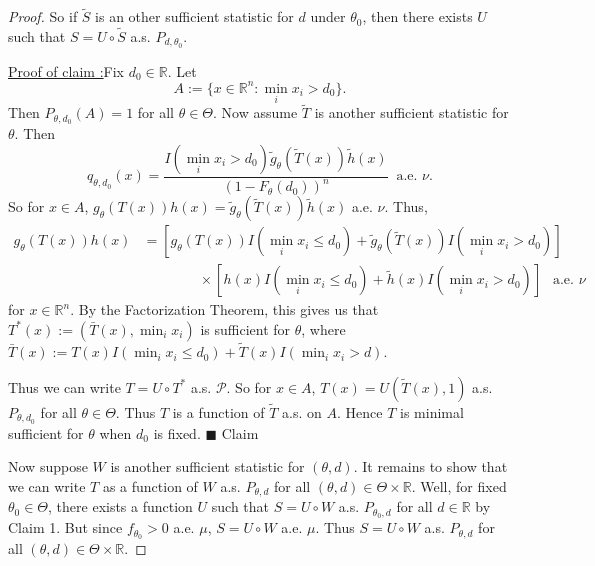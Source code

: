\documentclass[12pt]{article}
\newcounter{ProofCounter}
\newcounter{ClaimCounter}[ProofCounter]
\newenvironment{claim}[1]{\vspace{1mm}\stepcounter{ClaimCounter}\par\noindent\underline{\bf Claim \theClaimCounter:}\space#1}{}
\newenvironment{claimproof}[1]{\par\noindent\underline{Proof of claim \theClaimCounter:}\space#1}{\hfill $\blacksquare$ Claim \theClaimCounter}
\begin{document}
\begin{enumerate}[label=(\alph*)]
\begin{proof}
      \vspace{5mm}

      So if $\tilde{S}$ is an other sufficient statistic for $d$ under $\theta_0$, then there exists $U$ such that $S = U\circ \tilde{S}$ a.s. $P_{d,\theta_0}$.


      \begin{claimproof}
        Fix $d_0 \in \mathbb{R}$. Let 
        \[ 
          A := \{x \in \mathbb{R}^{n} : \min_{i} x_{i} > d_0\}.
        \]
        Then $P_{\theta, d_0}(A) = 1$ for all $\theta \in \Theta$. Now assume $\tilde{T}$ is another sufficient statistic for $\theta$.
        Then 
        \[ 
          q_{\theta, d_0}(x) = \frac{I(\min_i x_i > d_0)\tilde{g}_{\theta}(\tilde{T}(x)) \tilde{h}(x)}{(1 - F_{\theta}(d_0))^{n}}  \ \text{ a.e. }\nu. 
        \]
        So for $x \in A$, $g_{\theta}(T(x))h(x) = \tilde{g}_{\theta}(\tilde{T}(x))\tilde{h}(x)$ a.e. $\nu$. Thus,
        \begin{align*}
          g_{\theta}(T(x))h(x) & = [g_{\theta}(T(x))I(\min_i x_i \leq d_0) + \tilde{g}_{\theta}(\tilde{T}(x))I(\min_i x_i > d_0)] \\
          & \qquad \qquad \times [h(x)I(\min_i x_i \leq d_0) + \tilde{h}(x)I(\min_i x_i > d_0)] \ \ \text{ a.e. }\nu 
        \end{align*}
        for $x \in \mathbb{R}^{n}$. By the Factorization Theorem, this gives us that $T^{*}(x) := (\bar{T}(x), \min_i x_i)$ is sufficient for $\theta$, where 
        $\bar{T}(x) := T(x)I(\min_i x_i \leq d_0) + \tilde{T}(x)I(\min_i x_i > d)$.
        
        Thus we can write $T = U\circ T^{*}$ a.s. $\mathcal{P}$. So for $x \in A$, $T(x) = U(\tilde{T}(x), 1)$ a.s. $P_{\theta, d_0}$
        for all $\theta \in \Theta$. Thus $T$ is a function of $\tilde{T}$ a.s. on $A$. Hence $T$ is minimal sufficient for $\theta$ when $d_0$ is
        fixed.
      \end{claimproof}

      \vspace{5mm}

      Now suppose $W$ is another sufficient statistic for $(\theta, d)$. It remains to show that we can write $T$ as a function of $W$ a.s.
      $P_{\theta, d}$ for all $(\theta, d) \in \Theta\times \mathbb{R}$. Well, for fixed $\theta_0 \in \Theta$, there exists a function $U$ such that
      $S = U\circ W$ a.s. $P_{\theta_0, d}$ for all $d \in \mathbb{R}$ by Claim 1. But since $f_{\theta_0} > 0$ a.e. $\mu$, $S = U\circ W$ a.e. $\mu$.
      Thus $S = U\circ W$ a.s. $P_{\theta, d}$ for all $(\theta, d) \in \Theta \times \mathbb{R}$. 


\end{proof}
\end{enumerate}
\end{document}
